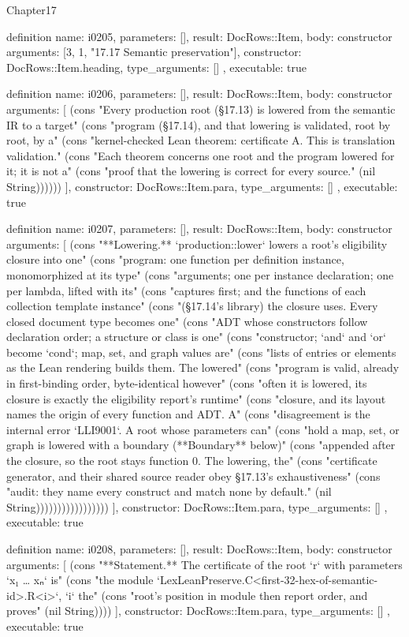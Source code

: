 \begin{lexlean}{Chapter17}
\begin{semanticmodule}
definition{
  name: i0205,
  parameters: [],
  result: DocRows::Item,
  body: constructor{
    arguments: [3, 1, "17.17 Semantic preservation"],
    constructor: DocRows::Item.heading,
    type_arguments: []
  },
  executable: true
}

definition{
  name: i0206,
  parameters: [],
  result: DocRows::Item,
  body: constructor{
    arguments: [
      (cons "Every production root (§17.13) is lowered from the semantic IR to a target" (cons "program (§17.14), and that lowering is validated, root by root, by a" (cons "kernel-checked Lean theorem: certificate A. This is translation validation." (cons "Each theorem concerns one root and the program lowered for it; it is not a" (cons "proof that the lowering is correct for every source." (nil String))))))
    ],
    constructor: DocRows::Item.para,
    type_arguments: []
  },
  executable: true
}

definition{
  name: i0207,
  parameters: [],
  result: DocRows::Item,
  body: constructor{
    arguments: [
      (cons "**Lowering.** `production::lower` lowers a root's eligibility closure into one" (cons "program: one function per definition instance, monomorphized at its type" (cons "arguments; one per instance declaration; one per lambda, lifted with its" (cons "captures first; and the functions of each collection template instance" (cons "(§17.14's library) the closure uses. Every closed document type becomes one" (cons "ADT whose constructors follow declaration order; a structure or class is one" (cons "constructor; `and` and `or` become `cond`; map, set, and graph values are" (cons "lists of entries or elements as the Lean rendering builds them. The lowered" (cons "program is valid, already in first-binding order, byte-identical however" (cons "often it is lowered, its closure is exactly the eligibility report's runtime" (cons "closure, and its layout names the origin of every function and ADT. A" (cons "disagreement is the internal error `LLI9001`. A root whose parameters can" (cons "hold a map, set, or graph is lowered with a boundary (**Boundary** below)" (cons "appended after the closure, so the root stays function 0. The lowering, the" (cons "certificate generator, and their shared source reader obey §17.13's exhaustiveness" (cons "audit: they name every construct and match none by default." (nil String)))))))))))))))))
    ],
    constructor: DocRows::Item.para,
    type_arguments: []
  },
  executable: true
}

definition{
  name: i0208,
  parameters: [],
  result: DocRows::Item,
  body: constructor{
    arguments: [
      (cons "**Statement.** The certificate of the root `r` with parameters `x₁ … xₙ` is" (cons "the module `LexLeanPreserve.C<first-32-hex-of-semantic-id>.R<i>`, `i` the" (cons "root's position in module then report order, and proves" (nil String))))
    ],
    constructor: DocRows::Item.para,
    type_arguments: []
  },
  executable: true
}


\end{semanticmodule}
\end{lexlean}
